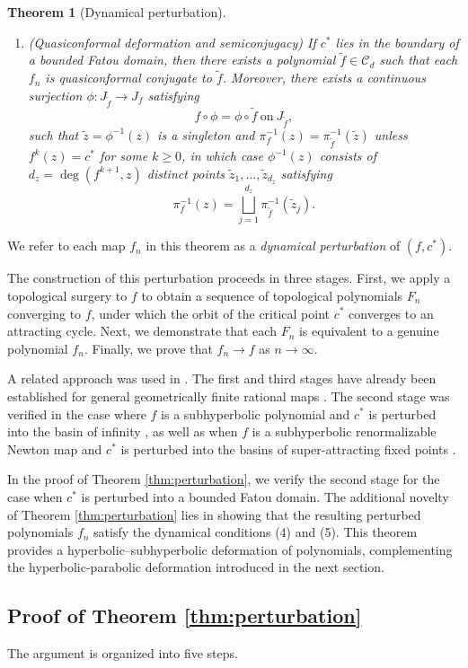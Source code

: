 \documentclass[a4paper,reqno,times, 11pt]{amsart}
\newtheorem{theorem}{Theorem}[section]
\theoremstyle{remark}
\theoremstyle{plain}
\numberwithin{equation}{section}
\def\CCCC{\mathscr C}
\def\t{\tilde}
\begin{document}
\begin{theorem}[Dynamical perturbation]
\begin{enumerate}
			\item \textup{(Quasiconformal deformation and semiconjugacy)} If $c^*$ lies in the boundary of  a bounded Fatou domain, then there exists a polynomial $\t{f}\in\CCCC_d$ such that each $f_n$ is  quasiconformal conjugate to $\t{f}$. Moreover, there exists a continuous surjection $\phi:J_{\t{f}}\to J_f$ satisfying $$f\circ\phi=\phi\circ \t{f}\ \text{on}\ J_{\t{f}},$$ such that   $\t{z}=\phi^{-1}(z)$ is a singleton and $\pi_f^{-1}(z)=\pi_{\t{f}}^{-1}(\t{z})$ unless $f^k(z) = c^*$ for some $k \ge 0$, in which case $\phi^{-1}(z)$ consists of $d_z=\deg(f^{k+1}, z)$ distinct points $\t{z}_1,\ldots,\t{z}_{d_z}$ satisfying $$\pi_f^{-1}(z)=\bigsqcup_{j=1}^{d_z}\pi_{\t{f}}^{-1}(\t{z}_j).$$
					\end{enumerate}
	\end{theorem}
	
	We refer to each map $f_n$ in this theorem as a \emph{dynamical perturbation} of $(f,c^*)$.\vspace{3pt}
	
	The construction of this perturbation proceeds in three stages. First, we apply a topological surgery to $f$ to obtain a sequence of topological polynomials $F_n$ converging to $f$, under which the orbit of the critical point $c^*$
	converges to an attracting cycle. Next, we demonstrate that each $F_n$ is equivalent to a genuine  polynomial $f_n$. Finally, we prove that $f_n\to f$ as $n\to\infty$.
	
	A related approach was used in \cite{CT3,G,GZ}. The first and third stages have already been established for general geometrically finite rational maps \cite{G}. The second stage was verified in the case where $f$ is a subhyperbolic polynomial and $c^*$ is perturbed into the basin of infinity \cite{CT3, GZ}, as well as when $f$ is a subhyperbolic renormalizable Newton map and $c^*$
	is perturbed into the basins of super-attracting fixed points \cite{G}.
	
	In the proof of Theorem \ref{thm:perturbation}, we verify  the second stage for the case when $c^*$
	is perturbed into a bounded Fatou domain. The additional novelty of Theorem \ref{thm:perturbation} lies in showing that the resulting perturbed polynomials $f_n$ satisfy the  dynamical conditions (4) and (5). This theorem provides a hyperbolic–subhyperbolic deformation of polynomials, complementing the hyperbolic-parabolic deformation \cite{CT2} introduced in the next section.
	
\subsection{Proof of Theorem \ref{thm:perturbation}}
		The argument is organized into five steps. \vspace{2pt}
\end{document}
